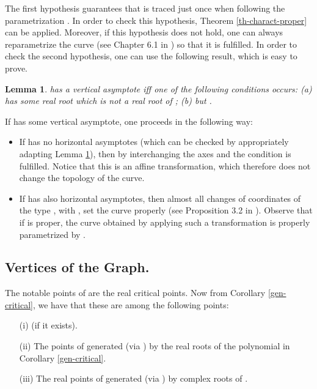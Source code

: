 \documentclass{elsart}
\newtheorem{lemma}[theorem]{{\bf Lemma}}
\begin{document}
The first hypothesis guarantees that  is traced just
once when following the parametrization . In order to
check this hypothesis, Theorem
\ref{th-charact-proper} can be applied. Moreover, if this hypothesis does not
hold, one can always reparametrize the curve (see Chapter 6.1 in
\cite{SWPD}) so that it is fulfilled. In order to check the second
hypothesis, one can use the following result, which is easy to prove.

\begin{lemma} \label{asymp-plane}
 has a vertical asymptote iff one of the following
conditions occurs: (a)  has some real root which is not a
real root of ; (b)  but
.
\end{lemma}








If  has some vertical asymptote, one proceeds in the following way:

\begin{itemize}
\item If  
has no horizontal asymptotes (which can be checked by
appropriately adapting Lemma \ref{asymp-plane}), then by interchanging
the axes  and  the condition is fulfilled. Notice that this is an affine
transformation, which therefore does not change the topology of the curve.
\item If  has also horizontal asymptotes, then
almost all changes of
coordinates of the type , with , set the curve properly (see Proposition 3.2 in
\cite{LaloCompl}). Observe that if  is proper, the curve  obtained by applying such a transformation is properly
parametrized by .
\end{itemize}

\subsection{Vertices of the Graph.}\label{vertices}

The notable points of  are the real critical points.
Now from Corollary \ref{gen-critical}, we have that these are
among the following points:

\begin{itemize}
\item [(i)]  (if it exists).
\item [(ii)] The points of  generated (via ) by the real roots of the polynomial  in Corollary \ref{gen-critical}.
    \item [(iii)] The real points of  generated (via ) by complex roots of .
    \end{itemize}
\end{document}
